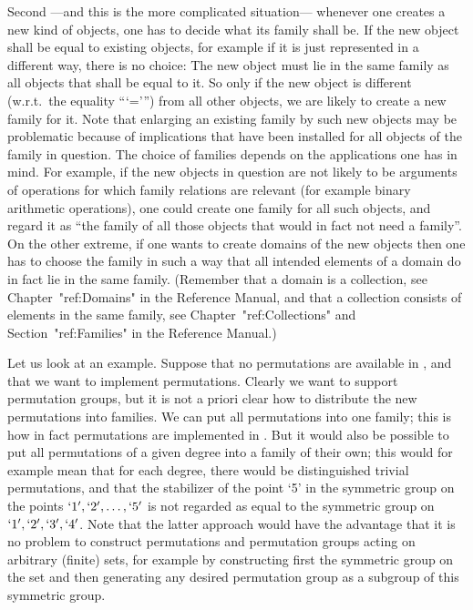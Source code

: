 Second ---and this is the more complicated situation---
whenever one creates a new kind of objects,
one has to decide what its family shall be.
If the new object shall be equal to existing objects,
for example if it is just represented in a different way,
there is no choice:
The new object must lie in the same family as all objects
that shall be equal to it.
So only if the new object is different (w.r.t.~the equality ```=''')
from all other {\GAP} objects, we are likely to create a new family
for it.
Note that enlarging an existing family by such new objects
may be problematic because of implications that have been
installed for all  objects of the family in question.
The choice of families depends on the applications one has in mind.
For example, if the new objects in question are not likely to be
arguments of operations for which family relations are relevant
(for example binary arithmetic operations),
one could create one family for all such objects,
and regard it as ``the family of all those {\GAP} objects that would
in fact not need a family''.
On the other extreme, if one wants to create domains of the new objects
then one has to choose the family in such a way that all intended
elements of a domain do in fact lie in the same family.
(Remember that a domain is a collection, see Chapter~"ref:Domains"
in the Reference Manual, and that a collection consists of elements
in the same family, see Chapter~"ref:Collections" and Section~"ref:Families"
in the Reference Manual.)

Let us look at an example.
Suppose that no permutations are available in {\GAP},
and that we want to implement permutations.
Clearly we want to support permutation groups,
but it is not a priori clear how to distribute the new permutations
into families.
We can put all permutations into one family;
this is how in fact permutations are implemented in {\GAP}.
But it would also be possible to put all permutations of a given degree
into a family of their own;
this would for example mean that for each degree,
there would be distinguished trivial permutations,
and that the stabilizer of the point `5' in the symmetric group on the
points $`1', `2', \ldots, `5'$ is not regarded as equal to the
symmetric group on $`1', `2', `3', `4'$.
Note that the latter approach would have the advantage that it is
no problem to construct permutations and permutation groups acting on
arbitrary (finite) sets,
for example by constructing first the symmetric group on the set
and then generating any desired permutation group as a subgroup of this
symmetric group.

